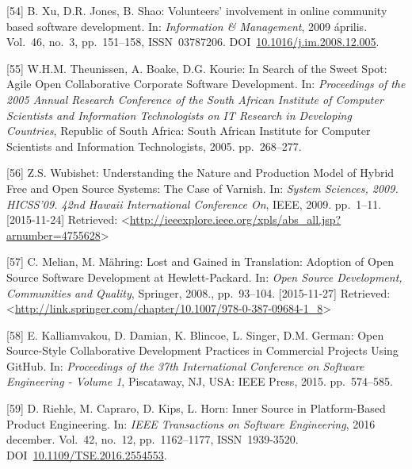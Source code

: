 \documentclass[12pt,magyar,a4paper,oneside]{scrreprt}
\newenvironment{cslreferences}%
  {}%
  {\par}
\begin{document}
\begin{cslreferences}
\leavevmode\hypertarget{ref-xu_volunteers_2009}{}%
{[}54{]} B. Xu, D.R. Jones, B. Shao: Volunteers' involvement in online
community based software development. In: \emph{Information \&
Management}, 2009 április. Vol.~46, no.~3, pp.~151--158, ISSN~03787206.
DOI~\href{https://doi.org/10.1016/j.im.2008.12.005}{10.1016/j.im.2008.12.005}.

\leavevmode\hypertarget{ref-theunissen_search_2005}{}%
{[}55{]} W.H.M. Theunissen, A. Boake, D.G. Kourie: In Search of the
Sweet Spot: Agile Open Collaborative Corporate Software Development. In:
\emph{Proceedings of the 2005 Annual Research Conference of the South
African Institute of Computer Scientists and Information Technologists
on IT Research in Developing Countries}, Republic of South Africa: South
African Institute for Computer Scientists and Information Technologists,
2005. pp.~268--277.

\leavevmode\hypertarget{ref-wubishet_understanding_2009}{}%
{[}56{]} Z.S. Wubishet: Understanding the Nature and Production Model of
Hybrid Free and Open Source Systems: The Case of Varnish. In:
\emph{System Sciences, 2009. HICSS'09. 42nd Hawaii International
Conference On}, IEEE, 2009. pp.~1--11. {[}2015-11-24{]} Retrieved:
\textless{}\url{http://ieeexplore.ieee.org/xpls/abs_all.jsp?arnumber=4755628}\textgreater{}

\leavevmode\hypertarget{ref-melian_lost_2008}{}%
{[}57{]} C. Melian, M. Mähring: Lost and Gained in Translation: Adoption
of Open Source Software Development at Hewlett-Packard. In: \emph{Open
Source Development, Communities and Quality}, Springer, 2008.,
pp.~93--104. {[}2015-11-27{]} Retrieved:
\textless{}\url{http://link.springer.com/chapter/10.1007/978-0-387-09684-1_8}\textgreater{}

\leavevmode\hypertarget{ref-kalliamvakou_open_2015}{}%
{[}58{]} E. Kalliamvakou, D. Damian, K. Blincoe, L. Singer, D.M. German:
Open Source-Style Collaborative Development Practices in Commercial
Projects Using GitHub. In: \emph{Proceedings of the 37th International
Conference on Software Engineering - Volume 1}, Piscataway, NJ, USA:
IEEE Press, 2015. pp.~574--585.

\leavevmode\hypertarget{ref-riehle_inner_2016}{}%
{[}59{]} D. Riehle, M. Capraro, D. Kips, L. Horn: Inner Source in
Platform-Based Product Engineering. In: \emph{IEEE Transactions on
Software Engineering}, 2016 december. Vol.~42, no.~12, pp.~1162--1177,
ISSN~1939-3520.
DOI~\href{https://doi.org/10.1109/TSE.2016.2554553}{10.1109/TSE.2016.2554553}.


\end{cslreferences}
\end{document}
